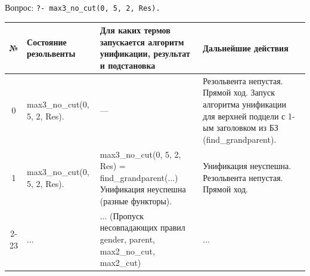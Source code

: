 Вопрос: \texttt{?- max3\_no\_cut(0, 5, 2, Res).}

\begin{tabularx}{\textwidth}{|c|>{\small}X|>{\small}X|>{\small}X|}
	\hline
	\textbf{№}                                                                         &
	\textbf{Состояние резольвенты}                                                     &
	\textbf{Для каких термов запускается алгоритм унификации, результат и подстановка} &
	\textbf{Дальнейшие действия}                                                                 \\
	\hline

	0                                                                                  &
	max3\_no\_cut(0, 5, 2, Res).                                                       &
	—                                                                                  &
	Резольвента непустая. \newline
	Прямой ход. \newline
	Запуск алгоритма унификации для верхней подцели с 1-ым заголовком из БЗ (find\_grandparent). \\
	\hline

	1                                                                                  &
	max3\_no\_cut(0, 5, 2, Res).                                                       &
	max3\_no\_cut(0, 5, 2, Res) = \newline
	find\_grandparent(...) \newline
	Унификация неуспешна (разные функторы).                                            &
	Унификация неуспешна. \newline
	Резольвента непустая. \newline
	Прямой ход.                                                                                  \\
	\hline

	2-23                                                                               &
	...                                                                                &
	... (Пропуск несовпадающих правил gender, parent, max2\_no\_cut, max2\_cut)        &
	...                                                                                          \\
	\hline


\end{tabularx}
